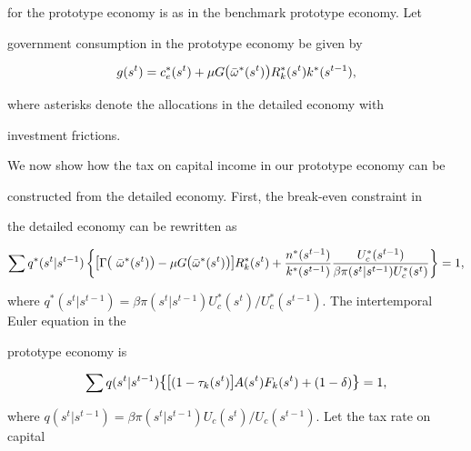 \documentclass[fleqn,leqno,11pt]{article}
\begin{document}
for the prototype economy is as in the benchmark prototype economy. Let

government consumption in the prototype economy be given by 

\begin{equation}

g(s^{t})=c_{e}^{\ast }(s^{t})+\mu G\text{{\large (}}\bar{\omega}^{\ast

}(s^{t})\text{{\large )}}R_{k}^{\ast }(s^{t})k^{\ast }(s^{t-1}),

\label{gbgg}

\end{equation}%

where asterisks denote the allocations in the detailed economy with

investment frictions.



We now show how the tax on capital income in our prototype economy can be

constructed from the detailed economy. First, the break-even constraint in

the detailed economy can be rewritten as 

\[

\sum q^{\ast }(s^{t}|s^{t-1})\left\{ \text{{\large [}}\Gamma \text{{\large (}%

}\bar{\omega}^{\ast }(s^{t})\text{{\large )}}-\mu G\text{{\large (}}\bar{%

\omega}^{\ast }(s^{t})\text{{\large )]}}R_{k}^{\ast }(s^{t})+\frac{n^{\ast

}(s^{t-1})}{k^{\ast }(s^{t-1})}\frac{U_{c}^{\ast }(s^{t-1})}{\beta \pi

(s^{t}|s^{t-1})U_{c}^{\ast }(s^{t})}\right\} =1, 

\]

where $q^{\ast }(s^{t}|s^{t-1})=\beta \pi (s^{t}|s^{t-1})U_{c}^{\ast

}(s^{t})/U_{c}^{\ast }(s^{t-1}).$ The intertemporal Euler equation in the

prototype economy is



\[

\sum q(s^{t}|s^{t-1})\text{{\large \{[}}(1-\tau _{k}(s^{t})\text{{\large ]}}%

A(s^{t})F_{k}(s^{t})+(1-\delta )\text{{\large \}}}=1, 

\]%

where $q(s^{t}|s^{t-1})=\beta \pi

(s^{t}|s^{t-1})U_{c}(s^{t})/U_{c}(s^{t-1}). $ Let the tax rate on capital
\end{document}
